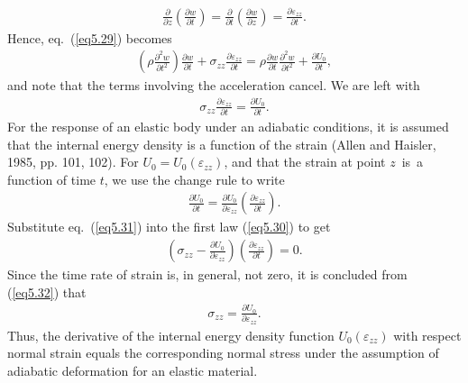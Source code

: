 \documentclass{AeroStructure-ERJohnson}
\begin{document}
\begin{align*}
\frac{\partial}{\partial z}\left(\frac{\partial w}{\partial t}\right)=\frac{\partial}{\partial t}\left(\frac{\partial w}{\partial z}\right)=\frac{\partial \varepsilon_{z z}}{\partial t}.
\end{align*}
Hence, eq.~(\ref{eq5.29}) becomes
\begin{align*}
\left(\rho \frac{\partial^{2} w}{\partial t^{2}}\right) \frac{\partial w}{\partial t}+\sigma_{z z} \frac{\partial \varepsilon_{z z}}{\partial t}=\rho \frac{\partial w}{\partial t} \frac{\partial^{2} w}{\partial t^{2}}+\frac{\partial U_{0}}{\partial t},
\end{align*}
and note that the terms involving the acceleration cancel. We are left with
\begin{align}\label{eq5.30}
\sigma_{z z} \frac{\partial \varepsilon_{z z}}{\partial t}=\frac{\partial U_{0}}{\partial t}.
\end{align}
For the response of an elastic body under an adiabatic conditions, it is assumed that the internal energy density is a function of the strain (Allen and Haisler, 1985, pp. 101, 102). For $U_{0}=U_{0}\left(\varepsilon_{z z}\right)$, and that the strain at point $z$~is~a function of time $t$, we use the change rule to write
\begin{align}\label{eq5.31}
\frac{\partial U_{0}}{\partial t}=\frac{\partial U_{0}}{\partial \varepsilon_{z z}}\left(\frac{\partial \varepsilon_{z z}}{\partial t}\right).
\end{align}
Substitute eq.~(\ref{eq5.31}) into the first law (\ref{eq5.30}) to get
\begin{align}\label{eq5.32}
\left(\sigma_{z z}-\frac{\partial U_{0}}{\partial \varepsilon_{z z}}\right)\left(\frac{\partial \varepsilon_{z z}}{\partial t}\right)=0.
\end{align}
Since the time rate of strain is, in general, not zero, it is concluded from (\ref{eq5.32}) that
\begin{align}\label{eq5.33}
\sigma_{z z}=\frac{\partial U_{0}}{\partial \varepsilon_{z z}}.
\end{align}
Thus, the derivative of the internal energy density function $U_{0}(\varepsilon_{z z})$ with respect normal strain equals the corresponding normal stress under the assumption of adiabatic deformation for an elastic material.
\end{document}
